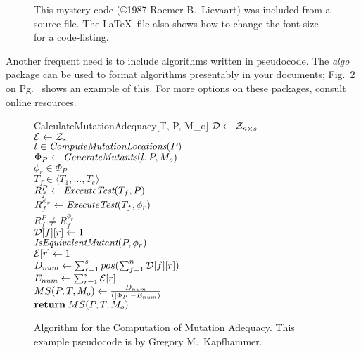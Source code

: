 \documentclass[11pt]{article}
\begin{document}
\begin{figure}[t]
\lstset{basicstyle=\scriptsize}

\caption{This mystery code (\copyright 1987 Roemer B.\ Lievaart) was
included from a source file.  The \LaTeX\ file also shows how to
change the font-size for a code-listing.}\label{fig:surprisecode}
\end{figure}

Another frequent need is to include algorithms written in pseudocode.
The \emph{algo} package can be used to format algorithms presentably in your
documents; Fig.~\ref{fig:mutation_adequacy} on
Pg.~\pageref{fig:mutation_adequacy} shows an example of this.
For more options on these packages, consult online resources.

\begin{figure}[t]
\begin{algorithm}{CalculateMutationAdequacy}[T, P, M_o]
{
}
${\cal D} \mathrel{\leftarrow} {\cal Z}_{n \times s}$ \\
${\cal E} \mathrel{\leftarrow} {\cal Z}_{s}$ \\
\qfor $l \in \mbox{\it ComputeMutationLocations}(P)$ \\
\qdo $\Phi_P \mathrel{\leftarrow} \mbox{\it GenerateMutants}(l,P,M_o)$ \\
\qfor $\phi_r \in \Phi_P$ \\
\qdo \qfor $T_f \in \langle T_1, \ldots, T_e \rangle$ \\
\qdo $R_f^P \mathrel{\leftarrow} \mbox{\it ExecuteTest}(T_f,P)$ \\
$R_f^{\phi_r} \mathrel{\leftarrow} \mbox{\it ExecuteTest}(T_f,\phi_r)$ \\
\qif $R_f^P \neq R_f^{\phi_r}$ \\
\qdo ${\cal D}[f][r] \mathrel{\leftarrow} 1$ \\
\qelse \qif ${\it \mbox{\it IsEquivalentMutant}}(P,\phi_r)$
                                                 \\ \label{equivalent}
\qdo ${\cal E}[r] \mathrel{\leftarrow} 1$ \qfi \qfi \qrof \qrof \qrof \\
$D_{num} \mathrel{\leftarrow} \sum_{r=1}^s pos( \sum_{f=1}^n {\cal D}[f][r] )$ \\ \label{sum1}
$E_{num} \mathrel{\leftarrow} \sum_{r=1}^s {\cal E}[r] $ \\ \label{sum2}
$MS(P,T,M_o) \mathrel{\leftarrow} \frac{D_{num}}{(|\Phi_P| - E_{num})}$ \\ \label{result}
$\textbf{return} \; MS(P,T,M_o)$
\end{algorithm}
\caption{Algorithm for the Computation of Mutation Adequacy.  This example
pseudocode is by Gregory M.\ Kapfhammer.}
\label{fig:mutation_adequacy}
\end{figure}
\end{document}
